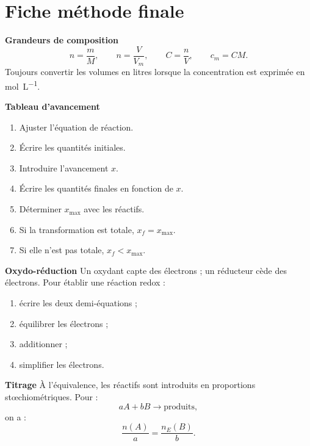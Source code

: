 \documentclass[11pt,a4paper]{article}
\begin{document}
\newpage

\section{Fiche méthode finale}

\begin{retenirbox}
\textbf{Grandeurs de composition}
\[
n=\frac{m}{M},\qquad n=\frac{V}{V_m},\qquad C=\frac{n}{V},\qquad c_m=CM.
\]
Toujours convertir les volumes en litres lorsque la concentration est exprimée en \si{mol.L^{-1}}.
\end{retenirbox}

\begin{methodbox}
\textbf{Tableau d'avancement}
\begin{enumerate}
  \item Ajuster l'équation de réaction.
  \item Écrire les quantités initiales.
  \item Introduire l'avancement $x$.
  \item Écrire les quantités finales en fonction de $x$.
  \item Déterminer $x_{\max}$ avec les réactifs.
  \item Si la transformation est totale, $x_f=x_{\max}$.
  \item Si elle n'est pas totale, $x_f<x_{\max}$.
\end{enumerate}
\end{methodbox}

\begin{retenirbox}
\textbf{Oxydo-réduction}
Un oxydant capte des électrons ; un réducteur cède des électrons.
Pour établir une réaction redox :
\begin{enumerate}
  \item écrire les deux demi-équations ;
  \item équilibrer les électrons ;
  \item additionner ;
  \item simplifier les électrons.
\end{enumerate}
\end{retenirbox}

\begin{methodbox}
\textbf{Titrage}
À l'équivalence, les réactifs sont introduits en proportions stœchiométriques.
Pour :
\[
aA+bB\to \text{produits},
\]
on a :
\[
\frac{n(A)}{a}=\frac{n_E(B)}{b}.
\]
\end{methodbox}
\end{document}

